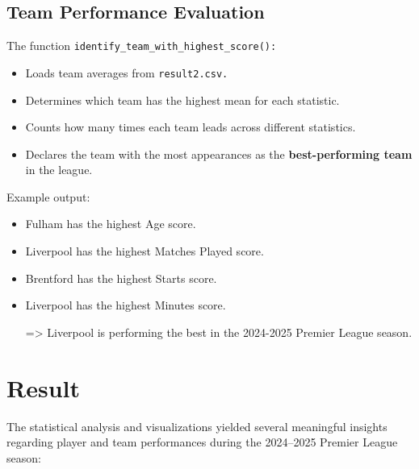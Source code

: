 \documentclass[12pt,a4paper]{report}
\begin{document}
\subsection{Team Performance Evaluation}
The function \texttt{identify\_team\_with\_highest\_score():}
\begin{itemize}
    \item Loads team averages from \texttt{result2.csv.}
    \item Determines which team has the highest mean for each statistic.
    \item Counts how many times each team leads across different statistics.
    \item Declares the team with the most appearances as the \textbf{best-performing team} in the league.
\end{itemize}

Example output:
\begin{itemize}
    \item Fulham has the highest Age score.
    \item Liverpool has the highest Matches Played score.
    \item Brentford has the highest Starts score.
    \item Liverpool has the highest Minutes score.
   
   => Liverpool is performing the best in the 2024-2025 Premier League season.
\end{itemize}

\section{Result}

The statistical analysis and visualizations yielded several meaningful insights regarding player and team performances during the 2024–2025 Premier League season:
\end{document}
